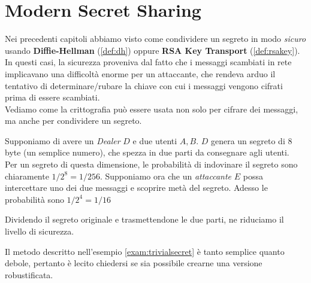 \chapter{Modern Secret Sharing}
Nei precedenti capitoli abbiamo visto come condividere un segreto in modo \textit{sicuro} usando \textbf{Diffie-Hellman} (\cref{def:dh}) oppure \textbf{RSA Key Transport} (\cref{def:rsakey}). In questi casi, la sicurezza proveniva dal fatto che i messaggi scambiati in rete implicavano una difficoltà enorme per un attaccante, che rendeva arduo il tentativo di determinare/rubare la chiave con cui i messaggi vengono cifrati prima di essere scambiati.\\
Vediamo come la crittografia può essere usata non solo per cifrare dei messaggi, ma anche per condividere un segreto.
\begin{example}\label{exam:trivialsecret}
Supponiamo di avere un \textit{Dealer} $D$ e due utenti $A,B$. $D$ genera un segreto di 8 byte (un semplice numero), che spezza in due parti da consegnare agli utenti.\\
Per un segreto di questa dimensione, le probabilità di indovinare il segreto sono chiaramente $1/2^8=1/256$. Supponiamo ora che un \textit{attaccante} $E$ possa intercettare uno dei due messaggi e scoprire metà del segreto. Adesso le probabilità sono $1/2^4=1/16$
\end{example}
\begin{remark}
Dividendo il segreto originale e trasmettendone le due parti, ne riduciamo il livello di sicurezza.
\end{remark}
Il metodo descritto nell'esempio \ref{exam:trivialsecret} è tanto semplice quanto debole, pertanto è lecito chiedersi se sia possibile crearne una versione robustificata.
